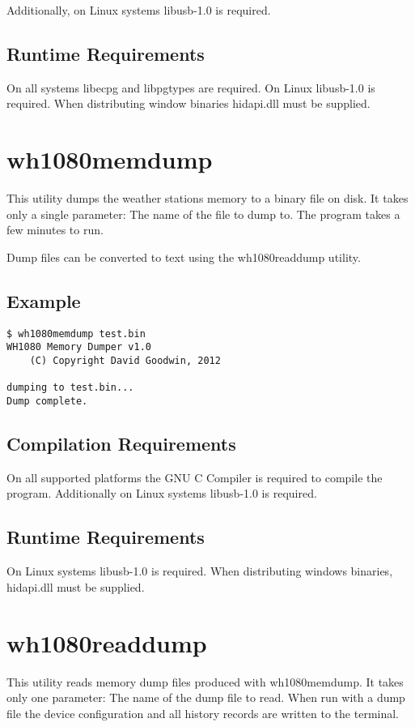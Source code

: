 \documentclass[a4paper,10pt,draft]{book}
\begin{document}
Additionally, on Linux systems libusb-1.0 is required.

\section{Runtime Requirements}
On all systems libecpg and libpgtypes are required. On Linux libusb-1.0 is required. When distributing window binaries hidapi.dll must be supplied.

\chapter{wh1080memdump}
This utility dumps the weather stations memory to a binary file on disk. It takes only a single parameter: The name of the file to dump to. The program takes a few minutes to run.

Dump files can be converted to text using the wh1080readdump utility.

\section{Example}
\begin{verbatim}
$ wh1080memdump test.bin
WH1080 Memory Dumper v1.0
	(C) Copyright David Goodwin, 2012

dumping to test.bin...
Dump complete.
\end{verbatim}


\section{Compilation Requirements}
On all supported platforms the GNU C Compiler is required to compile the program. Additionally on Linux systems libusb-1.0 is required.

\section{Runtime Requirements}
On Linux systems libusb-1.0 is required. When distributing windows binaries, hidapi.dll must be supplied.

\chapter{wh1080readdump}

This utility reads memory dump files produced with wh1080memdump. It takes only one parameter: The name of the dump file to read. When run with a dump file the device configuration and all history records are written to the terminal.
\end{document}
